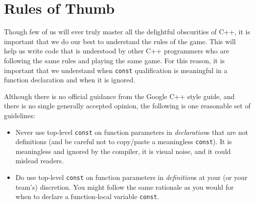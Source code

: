 \section{Rules of Thumb}
Though few of us will ever truly master all the delightful obscurities of C++, it is important that we do our best to understand the rules of the game. This will help us write code that is understood by other C++ programmers who are following the same rules and playing the same game. For this reason, it is important that we understand when \texttt{const} qualification is meaningful in a function declaration and when it is ignored.

Although there is no official guidance from the Google C++ style guide, and there is no single generally accepted opinion, the following is one reasonable set of guidelines:
\begin{itemize}
    \item Never use top-level \texttt{const} on function parameters in \emph{declaration}s that are not definitions (and be careful not to copy/paste a meaningless \texttt{const}). It is meaningless and ignored by the compiler, it is visual noise, and it could mislead readers.
    \item Do use top-level \texttt{const} on function parameters in \emph{definition}s at your (or your team’s) discretion. You might follow the same rationale as you would for when to declare a function-local variable \texttt{const}.
\end{itemize}


